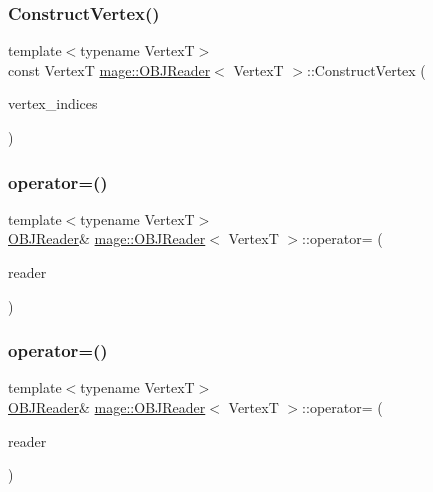\subsubsection{\texorpdfstring{Construct\+Vertex()}{ConstructVertex()}}
{\footnotesize\ttfamily template$<$typename VertexT$>$ \\
const VertexT \hyperlink{classmage_1_1_o_b_j_reader}{mage\+::\+O\+B\+J\+Reader}$<$ VertexT $>$\+::Construct\+Vertex (\begin{DoxyParamCaption}\item[{const X\+M\+U\+I\+N\+T3 \&}]{vertex\+\_\+indices }\end{DoxyParamCaption})\hspace{0.3cm}{\ttfamily [private]}}

\hypertarget{classmage_1_1_o_b_j_reader_a62e516060267f828c5aa1a3f23dcf55d}{}\label{classmage_1_1_o_b_j_reader_a62e516060267f828c5aa1a3f23dcf55d} 
\subsubsection{\texorpdfstring{operator=()}{operator=()}\hspace{0.1cm}{\footnotesize\ttfamily [1/2]}}
{\footnotesize\ttfamily template$<$typename VertexT$>$ \\
\hyperlink{classmage_1_1_o_b_j_reader}{O\+B\+J\+Reader}\& \hyperlink{classmage_1_1_o_b_j_reader}{mage\+::\+O\+B\+J\+Reader}$<$ VertexT $>$\+::operator= (\begin{DoxyParamCaption}\item[{const \hyperlink{classmage_1_1_o_b_j_reader}{O\+B\+J\+Reader}$<$ VertexT $>$ \&}]{reader }\end{DoxyParamCaption})\hspace{0.3cm}{\ttfamily [delete]}}

\hypertarget{classmage_1_1_o_b_j_reader_ac795c3b1d19ecf38735b76bc5b97fa80}{}\label{classmage_1_1_o_b_j_reader_ac795c3b1d19ecf38735b76bc5b97fa80} 
\subsubsection{\texorpdfstring{operator=()}{operator=()}\hspace{0.1cm}{\footnotesize\ttfamily [2/2]}}
{\footnotesize\ttfamily template$<$typename VertexT$>$ \\
\hyperlink{classmage_1_1_o_b_j_reader}{O\+B\+J\+Reader}\& \hyperlink{classmage_1_1_o_b_j_reader}{mage\+::\+O\+B\+J\+Reader}$<$ VertexT $>$\+::operator= (\begin{DoxyParamCaption}\item[{\hyperlink{classmage_1_1_o_b_j_reader}{O\+B\+J\+Reader}$<$ VertexT $>$ \&\&}]{reader }\end{DoxyParamCaption})\hspace{0.3cm}{\ttfamily [delete]}}

